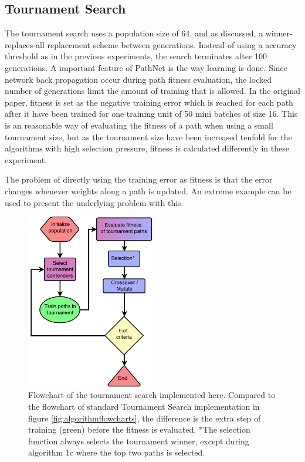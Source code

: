 \subsection{Tournament Search}
The tournament search uses a population size of 64, and as discussed, a winner-replaces-all replacement scheme between generations. Instead of using a accuracy threshold as in the previous experiments, the search terminates after 100 generations. A important feature of PathNet is the way learning is done. Since network back propagation occur during path fitness evaluation, the locked number of generations limit the amount of training that is allowed. In the original paper, fitness is set as the negative training error which is reached for each path after it have been trained for one training unit of 50 mini batches of size 16. This is an reasonable way of evaluating the fitness of a path when using a small tournament size, but as the tournament size have been increased tenfold for the algorithms with high selection pressure, fitness is calculated differently in these experiment. 

The problem of directly using the training error as fitness is that the error changes whenever weights along a path is updated. An extreme example can be used to present the underlying problem with this.

\begin{figure}[h]
    \centering
    \includegraphics[width=0.5\textwidth]{Chapters/Experiments/search_algo/figures/TS_implementation.pdf}
    \caption{Flowchart of the tournament search implemented here. Compared to the flowchart of standard Tournament Search implementation in figure \ref{fig:algorithmflowcharts}, the difference is the extra step of training (green) before the fitness is evaluated. *The selection function always selects the tournament winner, except during algorithm 1c where the top two paths is selected.}
    \label{fig:ts_flowchart}
\end{figure}


